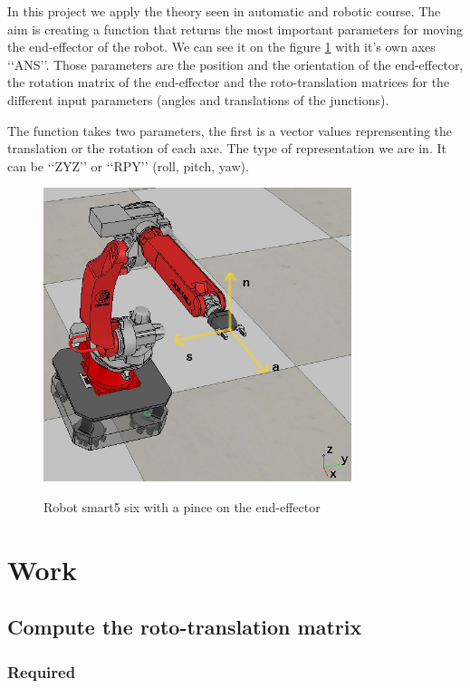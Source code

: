 \documentclass[english,a4paper,11pt]{report}
\begin{document}
	In this project we apply the theory seen in automatic and robotic course.
	The aim is creating a function that returns the most important parameters for moving the end-effector of the robot. We can see it on the figure \ref{endEf} with it\rq{}s own axes \lq\lq{}ANS\rq\rq{}. Those parameters are the position and the orientation of the end-effector, the rotation matrix of the end-effector and the roto-translation matrices for the different input parameters (angles and translations of the junctions).
	
	The function takes two parameters, the first is a vector values reprensenting the translation or the rotation of each axe. The type of representation we are in. It can be \lq\lq{}ZYZ\rq\rq{} or \lq\lq{}RPY\rq\rq{} (roll, pitch, yaw).
	\begin{figure}[h]
	\center
		\includegraphics[width=9cm]{images_not_compressed/endEffector.png}
		\label{endEf}
		\caption{Robot smart5 six with a pince on the end-effector}
	\end{figure}

	\chapter{Work}
	\section{Compute the roto-translation matrix}
	\subsection{Required}
	
	
	
\end{document}
